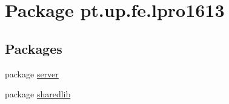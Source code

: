 \hypertarget{namespacept_1_1up_1_1fe_1_1lpro1613}{}\section{Package pt.\+up.\+fe.\+lpro1613}
\label{namespacept_1_1up_1_1fe_1_1lpro1613}
\subsection*{Packages}
\begin{DoxyCompactItemize}
\item 
package \hyperlink{namespacept_1_1up_1_1fe_1_1lpro1613_1_1server}{server}
\item 
package \hyperlink{namespacept_1_1up_1_1fe_1_1lpro1613_1_1sharedlib}{sharedlib}
\end{DoxyCompactItemize}

